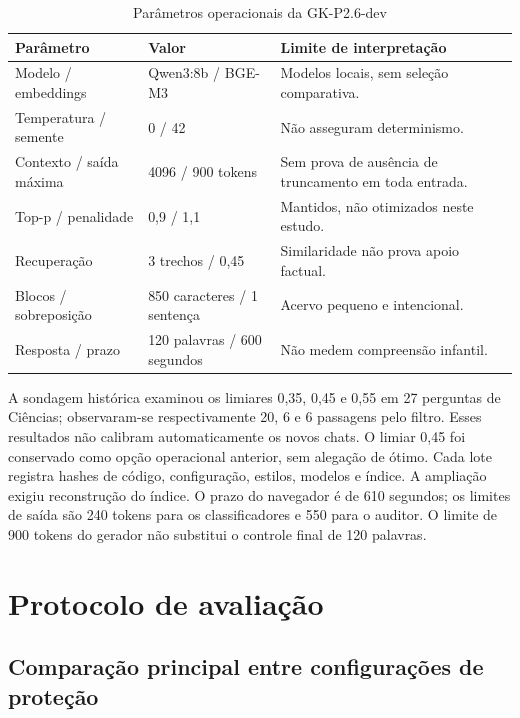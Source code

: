 \begin{table}[htbp]\centering\small\SingleSpacing
\caption{Parâmetros operacionais da GK-P2.6-dev}\label{tab:parametros}
\begin{tabularx}{\textwidth}{L{4.1cm} L{2.8cm} Y}
\toprule Parâmetro & Valor & Limite de interpretação \\\midrule
Modelo / embeddings & Qwen3:8b / BGE-M3 & Modelos locais, sem seleção comparativa. \\
Temperatura / semente & 0 / 42 & Não asseguram determinismo. \\
Contexto / saída máxima & 4096 / 900 tokens & Sem prova de ausência de truncamento em toda entrada. \\
Top-p / penalidade & 0,9 / 1,1 & Mantidos, não otimizados neste estudo. \\
Recuperação & 3 trechos / 0,45 & Similaridade não prova apoio factual. \\
Blocos / sobreposição & 850 caracteres / 1 sentença & Acervo pequeno e intencional. \\
Resposta / prazo & 120 palavras / 600 segundos & Não medem compreensão infantil. \\
\bottomrule\end{tabularx}
\end{table}

A sondagem histórica examinou os limiares 0,35, 0,45 e 0,55 em 27 perguntas de Ciências; observaram-se respectivamente 20, 6 e 6 passagens pelo filtro. Esses resultados não calibram automaticamente os novos chats. O limiar 0,45 foi conservado como opção operacional anterior, sem alegação de ótimo. Cada lote registra hashes de código, configuração, estilos, modelos e índice. A ampliação exigiu reconstrução do índice. O prazo do navegador é de 610 segundos; os limites de saída são 240 tokens para os classificadores e 550 para o auditor. O limite de 900 tokens do gerador não substitui o controle final de 120 palavras.



\section{Protocolo de avaliação}

\subsection{Comparação principal entre configurações de proteção}\label{sec:comparacao_protecao}

